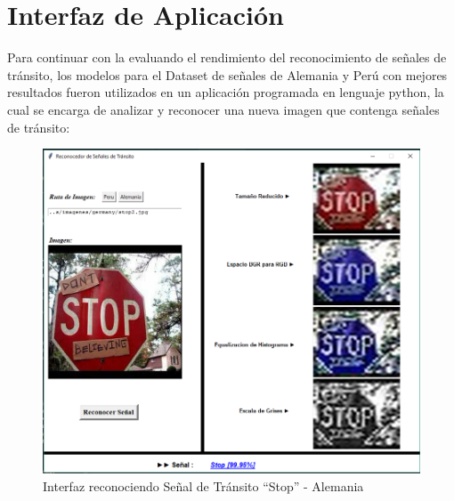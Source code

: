 	\section{Interfaz de Aplicación}
		
		Para continuar con la evaluando el rendimiento del reconocimiento de señales de tránsito, los modelos para el Dataset de señales de Alemania y Perú con mejores resultados fueron utilizados en un aplicación programada en lenguaje python, la cual se encarga de analizar y reconocer una nueva imagen que contenga señales de tránsito:

		
		\begin{figure}[H]
			\includegraphics[width=1\textwidth, height=\textheight,keepaspectratio]{images/interfazWithGermSign} 
			\begin{center}
			\caption{\small{Interfaz reconociendo Señal de Tránsito “Stop” - Alemania}}
			{\small{\fontsize{10}{16.8}\selectfont {Fuente propia}}}
			\end{center}
			\vspace{-1.5em}
		\end{figure}

